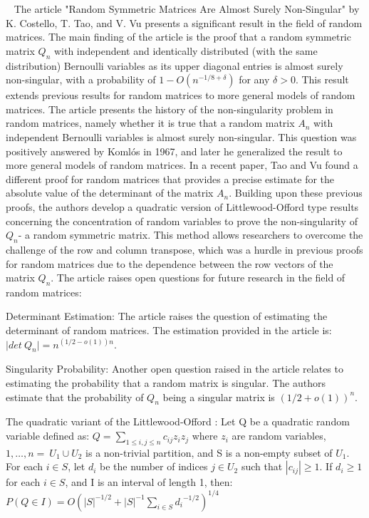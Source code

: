 


~\cite{costello2006random} The article "Random Symmetric Matrices Are Almost Surely Non-Singular"
by K. Costello, T. Tao, and V. Vu presents a significant result in the
field of random matrices. The main finding of the article is the proof
that a random symmetric matrix $ Q_n $ with independent and identically distributed 
(with the same distribution) Bernoulli variables as its upper diagonal entries
is almost surely non-singular, with a probability of $ 1-O(n^{-1/8+\delta}) $  for any $ \delta > 0 $.
This result extends previous results for random matrices to more general models of random matrices.
The article presents the history of the non-singularity problem in random matrices,
namely whether it is true that a random matrix $ A_n $ with independent Bernoulli variables
is almost surely non-singular. This question was positively answered by Komlós in 1967,
and later he generalized the result to more general models of random matrices. In a recent paper,
Tao and Vu found a different proof for random matrices that 
provides a precise estimate for the absolute value of the determinant of the matrix $ A_n $.
Building upon these previous proofs, the authors develop a quadratic version of 
Littlewood-Offord type results concerning the concentration of random variables to prove 
the non-singularity of $ Q_n $- a  random symmetric matrix.
This method allows researchers to overcome the challenge of the row and column 
transpose, which was a hurdle in previous proofs for random matrices due to the 
dependence between the row vectors of the matrix $ Q_n $.
The article raises open questions for future research in the field of random matrices:

Determinant Estimation: The article raises the question of estimating the 
determinant of random matrices. The estimation provided in the article is: $ |det\ {Q_n|=}n^{\left(1/2-o\left(1\right)\right)n} $.

Singularity Probability: Another open question raised in the article relates to estimating the 
probability that a random matrix is singular. The authors estimate that
the probability of $ Q_n $ being a singular matrix is $ {(1/2+o\left(1\right))}^n $.

The quadratic variant of the Littlewood-Offord :
Let Q be a quadratic random variable defined as: $ Q=\sum_{1\le i,j\le n}{c_{ij}z_iz_j} $  where $ z_i $
are random variables, $ {1,\ldots,n}=\ U_1\cup U_2  $
is a non-trivial partition, and S is a non-empty subset of
$ U_1 $. For each $ i\in S $, let  $d_i$  be the number of indices  $j\in U_2$ 
such that $|c_{ij}|\geq1$. If 
$ d_i\geq1$ for each $i\in S$, and I is an interval of length 1, then:
$ P\left(Q\in I\right)=O{({|S|}^{-1/2}+{|S|}^{-1}\sum_{i\in S}{d_i}^{-1/2})}^{1/4} $
